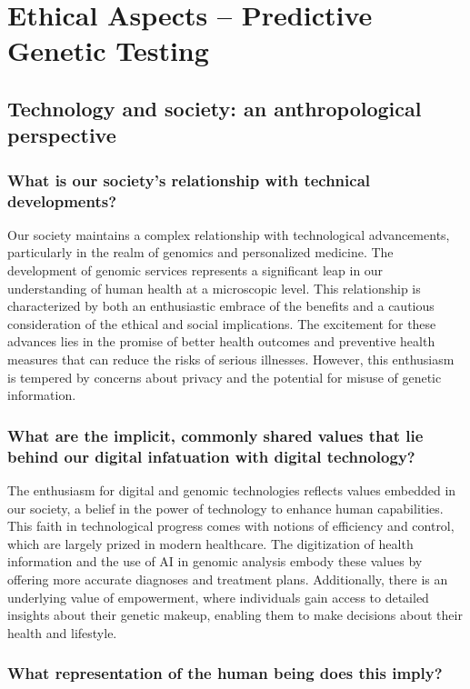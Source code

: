 \documentclass[a4paper]{article}
\begin{document}
\section{Ethical Aspects -- Predictive Genetic Testing}

\subsection{Technology and society: an anthropological perspective}

\subsubsection{What is our society's relationship with technical developments?}

Our society maintains a complex relationship with technological advancements, particularly in the realm of genomics and personalized medicine. The development of genomic services represents a significant leap in our understanding of human health at a microscopic level. This relationship is characterized by both an enthusiastic embrace of the benefits and a cautious consideration of the ethical and social implications. The excitement for these advances lies in the promise of better health outcomes and preventive health measures that can reduce the risks of serious illnesses. However, this enthusiasm is tempered by concerns about privacy and the potential for misuse of genetic information.

\subsubsection{What are the implicit, commonly shared values that lie behind our digital 
infatuation with digital technology?}

The enthusiasm for digital and genomic technologies reflects values embedded in our society, a belief in the power of technology to enhance human capabilities. This faith in technological progress comes with notions of efficiency and control, which are largely prized in modern healthcare. The digitization of health information and the use of AI in genomic analysis embody these values by offering more accurate diagnoses and treatment plans. Additionally, there is an underlying value of empowerment, where individuals gain access to detailed insights about their genetic makeup, enabling them to make decisions about their health and lifestyle.

\subsubsection{What representation of the human being does this imply?}
\end{document}
